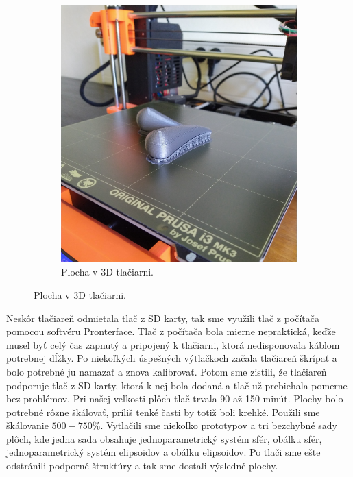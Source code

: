 \begin{figure}[h]
\begin{subfigure}[b]{0.49\textwidth}
     \includegraphics[width=\textwidth]{images/plocha_v_tlaciarni.jpg}
	\caption[Plocha v 3D tlačiarni.]{Plocha v 3D tlačiarni.}
	\label{fig:plocha_v_tlaciarni}
	\end{subfigure}
\end{figure}
Neskôr tlačiareň odmietala tlač z SD karty, tak sme využili tlač z počítača pomocou softvéru Pronterface. Tlač z počítača bola mierne nepraktická, keďže musel byť celý čas zapnutý a pripojený k tlačiarni, ktorá nedisponovala káblom potrebnej dĺžky. Po niekoľkých úspešných výtlačkoch začala tlačiareň škrípať a bolo potrebné ju namazať a znova kalibrovať. Potom sme zistili, že tlačiareň podporuje tlač z SD karty, ktorá k nej bola dodaná a tlač už prebiehala pomerne bez problémov. Pri našej veľkosti plôch tlač trvala 90 až 150 minút. Plochy bolo potrebné rôzne škálovať, príliš tenké časti by totiž boli krehké. Použili sme škálovanie $500-750\%$. Vytlačili sme niekoľko prototypov a tri bezchybné sady plôch, kde jedna sada obsahuje jednoparametrický systém sfér, obálku sfér, jednoparametrický systém elipsoidov a obálku elipsoidov. Po tlači sme ešte odstránili podporné štruktúry a tak sme dostali výsledné plochy. 

